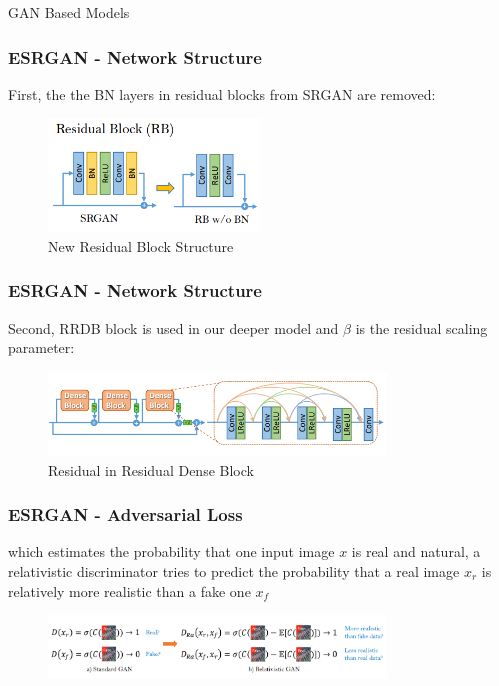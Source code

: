 \documentclass[11pt, presentation]{beamer}
\begin{document}
\begin{section}{GAN Based Models}
\begin{frame}
        \end{frame}
        \begin{frame}
            \frametitle{ESRGAN - Network Structure}
            First, the the BN layers in residual blocks from SRGAN are removed:
            \begin{figure}
                \includegraphics[width=0.5\textwidth]{images/esrgan-rb}
                \caption{New Residual Block Structure~\cite{wang2018}}
                \label{fig:esrgan-rb}
            \end{figure}
        \end{frame}
        \begin{frame}
            \frametitle{ESRGAN - Network Structure}
            Second, RRDB block is used in our deeper model and $\beta$ is the residual scaling parameter:
            \begin{figure}
                \includegraphics[width=0.8\textwidth]{images/esrgan-rrdb}
                \caption{Residual in Residual Dense Block~\cite{wang2018}}
                \label{fig:esrgan-rrdb}
            \end{figure}
        \end{frame}
        \begin{frame}
            \frametitle{ESRGAN - Adversarial Loss}
            which estimates the probability that one input image $x$ is real and
            natural, a relativistic discriminator tries to predict the probability that a real
            image $x_{r}$ is relatively more realistic than a fake one $x_{f}$
            \begin{figure}
                \includegraphics[width=0.8\textwidth]{images/esrgan-discriminator}

\end{figure}
\end{frame}
\end{section}
\end{document}
